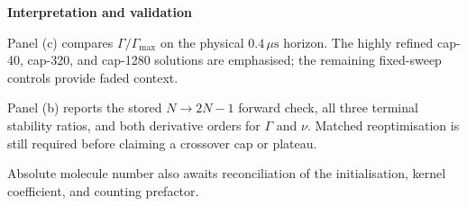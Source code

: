 \documentclass[9pt,a4paper,twocolumn,twoside]{rho-class/rho}
\newcommand{\showcasecardheading}[1]{%
    {\color{showcasenavy}\sffamily\bfseries\fontsize{12}{14}\selectfont #1\par}%
    \vspace{1mm}%
}
\begin{document}
\begin{minipage}[t]{0.315\textwidth}
    \vspace{0pt}
    \begin{tcolorbox}[showcasecard,colframe=showcasegold,colback=showcasegold!5,top=1.8mm,bottom=1.8mm]
        \showcasecardheading{Interpretation and validation}
        {\sffamily\fontsize{7.7}{9.4}\selectfont
        Panel (c) compares $\Gamma/\Gamma_{\max}$ on the physical $0.4\,\mu\mathrm{s}$ horizon. The highly refined cap-40, cap-320, and cap-1280 solutions are emphasised; the remaining fixed-sweep controls provide faded context.

        \vspace{0.8mm}
        Panel (b) reports the stored $N\rightarrow2N-1$ forward check, all three terminal stability ratios, and both derivative orders for $\Gamma$ and $\nu$. Matched reoptimisation is still required before claiming a crossover cap or plateau.

        \vspace{0.8mm}
        Absolute molecule number also awaits reconciliation of the initialisation, kernel coefficient, and counting prefactor.}
    \end{tcolorbox}
\end{minipage}

\clearpage
\restoregeometry
\flushbottom
\pagestyle{fancy}
\end{document}
